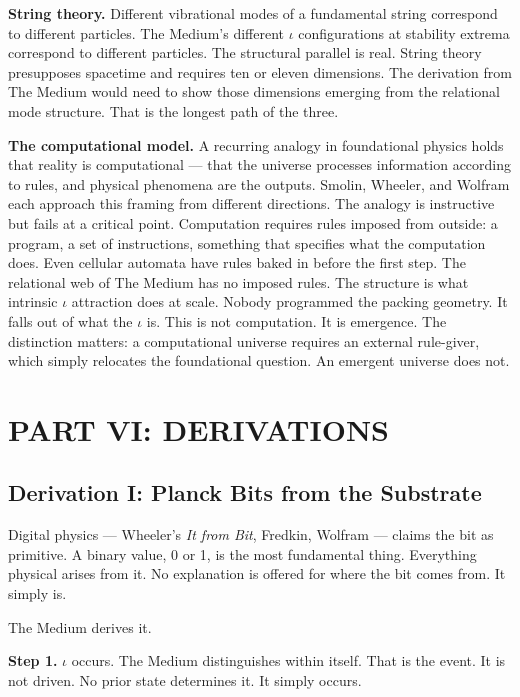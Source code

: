 \documentclass[11pt,letterpaper]{article}
\begin{document}
\textbf{String theory.} Different vibrational modes of a fundamental string correspond to different particles. The Medium's different \(\iota\) configurations at stability extrema correspond to different particles. The structural parallel is real. String theory presupposes spacetime and requires ten or eleven dimensions. The derivation from The Medium would need to show those dimensions emerging from the relational mode structure. That is the longest path of the three.

\textbf{The computational model.} A recurring analogy in foundational physics holds that reality is computational --- that the universe processes information according to rules, and physical phenomena are the outputs. Smolin, Wheeler, and Wolfram each approach this framing from different directions. The analogy is instructive but fails at a critical point. Computation requires rules imposed from outside: a program, a set of instructions, something that specifies what the computation does. Even cellular automata have rules baked in before the first step. The relational web of The Medium has no imposed rules. The structure is what intrinsic \(\iota\) attraction does at scale. Nobody programmed the packing geometry. It falls out of what the \(\iota\) is. This is not computation. It is emergence. The distinction matters: a computational universe requires an external rule-giver, which simply relocates the foundational question. An emergent universe does not.

\section{PART VI: DERIVATIONS}
\label{sec:orgc207c4b}


\subsection{Derivation I: Planck Bits from the Substrate}
\label{sec:orgc3f1044}

Digital physics --- Wheeler's \emph{It from Bit}, Fredkin, Wolfram --- claims the bit as primitive. A binary value, 0 or 1, is the most fundamental thing. Everything physical arises from it. No explanation is offered for where the bit comes from. It simply is.

The Medium derives it.

\textbf{Step 1.} \(\iota\) occurs. The Medium distinguishes within itself. That is the event. It is not driven. No prior state determines it. It simply occurs.
\end{document}
